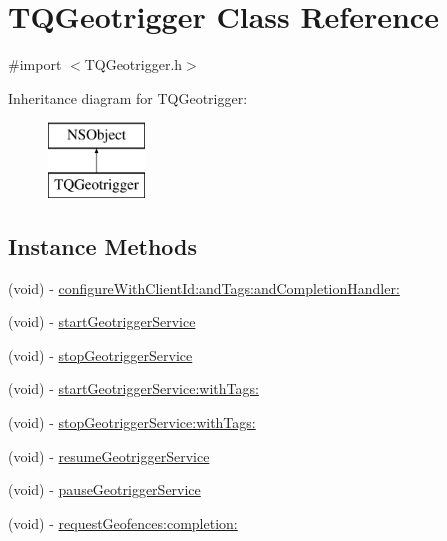 \hypertarget{interface_t_q_geotrigger}{}\section{T\+Q\+Geotrigger Class Reference}
\label{interface_t_q_geotrigger}


{\ttfamily \#import $<$T\+Q\+Geotrigger.\+h$>$}

Inheritance diagram for T\+Q\+Geotrigger\+:\begin{figure}[H]
\begin{center}
\leavevmode
\includegraphics[height=2.000000cm]{interface_t_q_geotrigger}
\end{center}
\end{figure}
\subsection*{Instance Methods}
\begin{DoxyCompactItemize}
\item 
(void) -\/ \hyperlink{interface_t_q_geotrigger_a373e03146f521ac53815ed3fa3d6d52e}{configure\+With\+Client\+Id\+:and\+Tags\+:and\+Completion\+Handler\+:}
\item 
(void) -\/ \hyperlink{interface_t_q_geotrigger_adab731af1533f72250348dea657301ce}{start\+Geotrigger\+Service}
\item 
(void) -\/ \hyperlink{interface_t_q_geotrigger_a730fde8f6f5e22db8785bab538c8aea9}{stop\+Geotrigger\+Service}
\item 
(void) -\/ \hyperlink{interface_t_q_geotrigger_a5feb3e0d3d3a4482ad968fefca944a92}{start\+Geotrigger\+Service\+:with\+Tags\+:}
\item 
(void) -\/ \hyperlink{interface_t_q_geotrigger_a265cb2de297e4a87eb43f592e05e50d8}{stop\+Geotrigger\+Service\+:with\+Tags\+:}
\item 
(void) -\/ \hyperlink{interface_t_q_geotrigger_aebbef6b764f07609971eaf67f39cd368}{resume\+Geotrigger\+Service}
\item 
(void) -\/ \hyperlink{interface_t_q_geotrigger_ae4539d4aede1b633322bacc8432d0195}{pause\+Geotrigger\+Service}
\item 
(void) -\/ \hyperlink{interface_t_q_geotrigger_abf215acd1e6afcbae1d768452b15d1d3}{request\+Geofences\+:completion\+:}
\end{DoxyCompactItemize}
